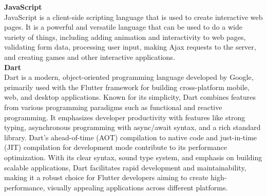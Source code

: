 \textbf{JavaScript}\\
JavaScript is a client-side scripting language that is used to create interactive web pages. It is a powerful and versatile language that can be used to do a wide variety of things, including adding animation and interactivity to web pages, validating form data, processing user input, making Ajax requests to the server, and creating games and other interactive applications.\\
\textbf{Dart}\\
Dart is a modern, object-oriented programming language developed by Google, primarily used with the Flutter framework for building cross-platform mobile, web, and desktop applications. Known for its simplicity, Dart combines features from various programming paradigms such as functional and reactive programming. It emphasizes developer productivity with features like strong typing, asynchronous programming with async/await syntax, and a rich standard library. Dart's ahead-of-time (AOT) compilation to native code and just-in-time (JIT) compilation for development mode contribute to its performance optimization. With its clear syntax, sound type system, and emphasis on building scalable applications, Dart facilitates rapid development and maintainability, making it a robust choice for Flutter developers aiming to create high-performance, visually appealing applications across different platforms.
